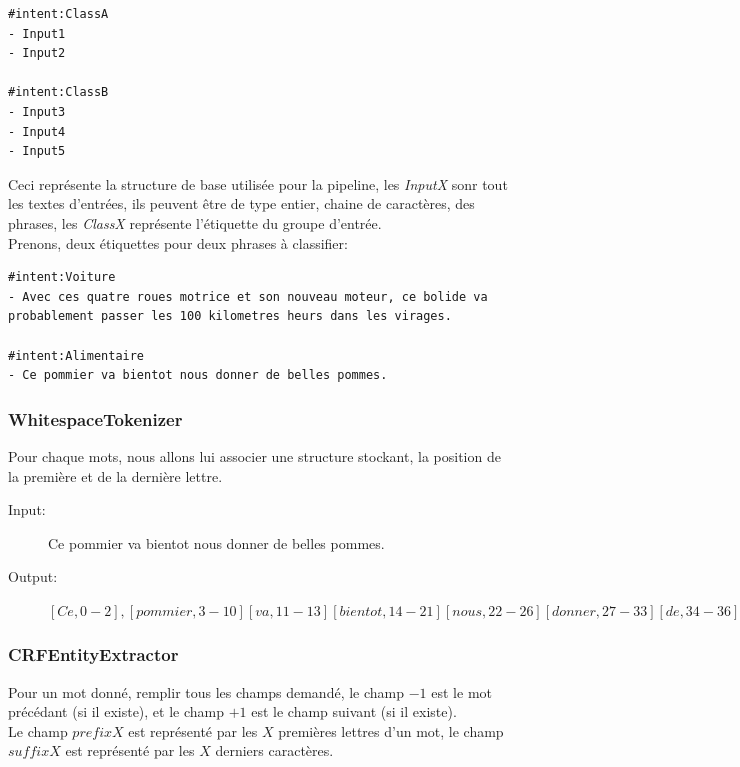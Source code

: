 \begin{lstlisting}
#intent:ClassA
- Input1
- Input2

#intent:ClassB
- Input3
- Input4
- Input5
\end{lstlisting}

Ceci représente la structure de base utilisée pour la pipeline, les \textit{InputX} sonr tout les textes d'entrées, ils peuvent être de type entier, chaine de caractères, des phrases, les \textit{ClassX} représente l'étiquette du groupe d'entrée.\\
Prenons, deux étiquettes pour deux phrases à classifier:\\

\begin{lstlisting}
#intent:Voiture
- Avec ces quatre roues motrice et son nouveau moteur, ce bolide va probablement passer les 100 kilometres heurs dans les virages.

#intent:Alimentaire
- Ce pommier va bientot nous donner de belles pommes.
\end{lstlisting}

\subsubsection{WhitespaceTokenizer}
Pour chaque mots, nous allons lui associer une structure stockant, la position de la première et de la dernière lettre. 

\begin{description}
\item[Input:] Ce pommier va bientot nous donner de belles pommes.\\
\item[Output:] $[Ce,0-2],[pommier,3-10][va,11-13][bientot,14-21][nous,22-26][donner,27-33][de,34-36][belles,37-43][pommes,44-50]$
\end{description}

\pagebreak
\subsubsection{CRFEntityExtractor}
Pour un mot donné, remplir tous les champs demandé, le champ $-1$ est le mot précédant (si il existe), et le champ $+1$ est le champ suivant (si il existe).\\
Le champ $prefixX$ est représenté par les $X$ premières lettres d'un mot, le champ $suffixX$ est représenté par les $X$ derniers caractères.

